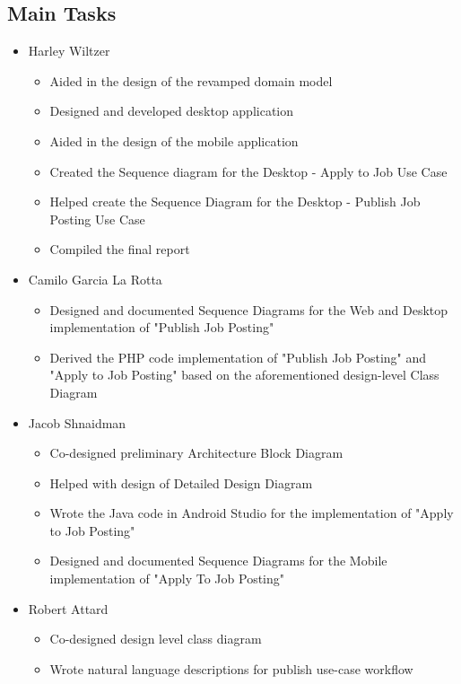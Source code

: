 \documentclass[12pt]{article}
\begin{document}
\subsection{Main Tasks}

\begin{itemize}
    \item Harley Wiltzer
    \begin{itemize}
        \item Aided in the design of the revamped domain model
        \item Designed and developed desktop application
        \item Aided in the design of the mobile application
        \item Created the Sequence diagram for the Desktop - Apply to Job Use Case
        \item Helped create the Sequence Diagram for the Desktop - Publish Job Posting Use Case
        \item Compiled the final report
    \end{itemize}
    \item Camilo Garcia La Rotta
    \begin{itemize}
        \item Designed and documented Sequence Diagrams for the Web and Desktop implementation of "Publish Job Posting"
        \item Derived the PHP code implementation of "Publish Job Posting" and "Apply to Job Posting" based on the aforementioned design-level Class Diagram
    \end{itemize}
    \item Jacob Shnaidman
        \begin{itemize}
            \item Co-designed preliminary Architecture Block Diagram
            \item Helped with design of Detailed Design Diagram
            \item Wrote the Java code in Android Studio for the implementation of "Apply to Job Posting" 
            \item Designed and documented Sequence Diagrams for the Mobile implementation of "Apply To Job Posting"
        \end{itemize}
    \item Robert Attard
    \begin{itemize}
        \item Co-designed design level class diagram
        \item Wrote natural language descriptions for publish use-case workflow

\end{itemize}
\end{itemize}
\end{document}
